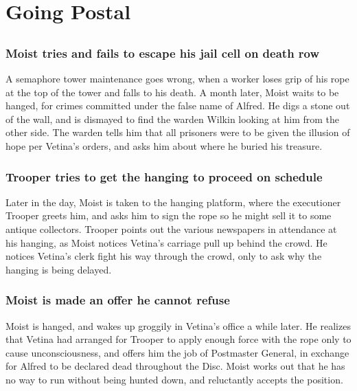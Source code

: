 \section{Going Postal}


\subsection{}
\subsubsection{\Gls{Moist} tries and fails to escape his jail cell on death row}
A semaphore tower maintenance goes wrong, when a worker loses grip of his rope at the top of the
tower and falls to his death. A month later, \Gls{Moist} waits to be hanged, for crimes committed
under the false name of \Gls{Alfred}. He digs a stone out of the wall, and is dismayed to find the
warden \Gls{Wilkin} looking at him from the other side. The warden tells him that all prisoners were
to be given the illusion of hope per \Gls{Vetina}'s orders, and asks him about where he buried his
treasure.

\subsubsection{\Gls{Trooper} tries to get the hanging to proceed on schedule}
Later in the day, \Gls{Moist} is taken to the hanging platform, where the executioner \Gls{Trooper}
greets him, and asks him to sign the rope so he might sell it to some antique collectors.
\Gls{Trooper} points out the various newspapers in attendance at his hanging, as \Gls{Moist} notices
\Gls{Vetina}'s carriage pull up behind the crowd. He notices \Gls{Vetina}'s clerk fight his way
through the crowd, only to ask why the hanging is being delayed.

\subsubsection{\Gls{Moist} is made an offer he cannot refuse}
\Gls{Moist} is hanged, and wakes up groggily in \Gls{Vetina}'s office a while later. He realizes
that \Gls{Vetina} had arranged for \Gls{Trooper} to apply enough force with the rope only to cause
unconsciousness, and offers him the job of Postmaster General, in exchange for \Gls{Alfred} to be
declared dead throughout the Disc. \Gls{Moist} works out that he has no way to run without being
hunted down, and reluctantly accepts the position.


